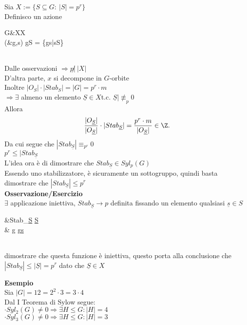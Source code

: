 \documentclass[12px]{article}
\begin{document}
	 \begin{dimo}
		 Sia $X:= \{S\subseteq G:\ |S| = p^r\}$\\
		 Definisco un azione\\
		  \begin{aligned}
			  G&\times X\rightarrow X\\
			  (&g,s) \rightarrow gS = \{gs|s\in S\}
		 \end{aligned}\\
		 Dalle osservazioni $ \Rightarrow p \not | \ |X|$ \\
		 D'altra parte, $x$ si decompone in $G$-orbite\\
		 Inoltre $|O_S|\cdot|Stab_S| = |G| = p^r\cdot m$\\
		  $ \Rightarrow \exists$ almeno un elemento $\underline S\in X$t.c.  $\underline S|\not\equiv_p 0$\\
		  Allora  
		   \[
			   \frac{|O_{\underline S}|}{|O_{\underline S}|}\cdot |Stab_{\underline S}| = \frac{p^r\cdot m}{|O_{\underline S}|}\in \Z
		  .\] 
		  Da cui segue che $|Stab_{\underline S}|\equiv_{p^r} 0$ \\
		  $p^r\leq |Stab_{\underline S}$\\
	  L'idea ora è di dimostrare che $Stab_{\underline S}\in Syl_p(G)$\\
	  Essendo uno stabilizzatore, è sicuramente un sottogruppo, quindi basta dimostrare che $|Stab_{\underline S}|\leq p^r$\\
	  \textbf{Osservazione/Esercizio}\\
	  $\exists$ applicazione iniettiva, $Stab_{\underline S} \rightarrow p$ definita fissando un elemento qualsiasi $\underline s\in S$ \\
	   \begin{aligned}
		   &Stab_{\underline S} \rightarrow \underline S\\
		   & g \rightarrow g\underline s
	  \end{aligned}\\
	  dimostrare che questa funzione è iniettiva, questo porta alla conclusione che $|Stab_{\underline S}|\leq |\underline S| = p^r$ dato che  $\underline S\in X$
	 \end{dimo}
	 \textbf{Esempio}\\
	 Sia $|G| = 12  = 2^2\cdot 3 = 3 \cdot 4$\\
	 Dal  I Teorema di Sylow segue:\\
	  $\cdot Syl_2(G)\neq 0 \Rightarrow \exists H\leq G : |H| = 4$ \\
	  $\cdot Syl_3(G)\neq 0 \Rightarrow \exists H\leq G : |H| = 3$ \\
\end{document}
